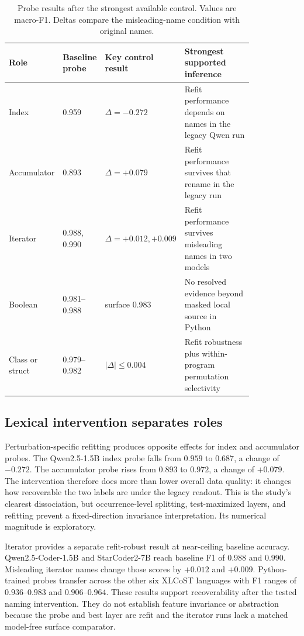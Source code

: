 \documentclass{article}
\begin{document}
\begin{table}[t]
\centering
\small
\setlength{\tabcolsep}{3.5pt}
\caption{Probe results after the strongest available control. Values are
macro-F1. Deltas compare the misleading-name condition with original names.}
\label{tab:evidence}
\begin{tabular}{p{0.13\linewidth}p{0.15\linewidth}p{0.17\linewidth}p{0.38\linewidth}}
\toprule
Role & Baseline probe & Key control result & Strongest supported inference \\
\midrule
Index & 0.959 & $\Delta=-0.272$ &
Refit performance depends on names in the legacy Qwen run \\
Accumulator & 0.893 & $\Delta=+0.079$ &
Refit performance survives that rename in the legacy run \\
Iterator & 0.988, 0.990 & $\Delta=+0.012,+0.009$ &
Refit performance survives misleading names in two models \\
Boolean & 0.981--0.988 & surface 0.983 &
No resolved evidence beyond masked local source in Python \\
Class or struct & 0.979--0.982 & $|\Delta|\leq0.004$ &
Refit robustness plus within-program permutation selectivity \\
\bottomrule
\end{tabular}
\end{table}

\subsection{Lexical intervention separates roles}

Perturbation-specific refitting produces opposite effects for index and
accumulator probes.
The Qwen2.5-1.5B index probe falls from $0.959$ to $0.687$, a change of
$-0.272$. The accumulator probe rises from $0.893$ to $0.972$, a change of
$+0.079$. The intervention therefore does more than lower overall data quality:
it changes how recoverable the two labels are under the legacy readout. This is
the study's clearest dissociation, but occurrence-level splitting,
test-maximized layers, and refitting prevent a fixed-direction invariance
interpretation. Its numerical magnitude is exploratory.

Iterator provides a separate refit-robust result at near-ceiling baseline
accuracy. Qwen2.5-Coder-1.5B and StarCoder2-7B reach baseline F1 of
$0.988$ and $0.990$. Misleading iterator names change those scores by
$+0.012$ and $+0.009$. Python-trained probes transfer across the other six
XLCoST languages with F1 ranges of $0.936$--$0.983$ and $0.906$--$0.964$.
These results support recoverability after the tested naming intervention.
They do not establish feature invariance or abstraction because the probe and
best layer are refit and the iterator runs lack a matched model-free surface
comparator.
\end{document}
